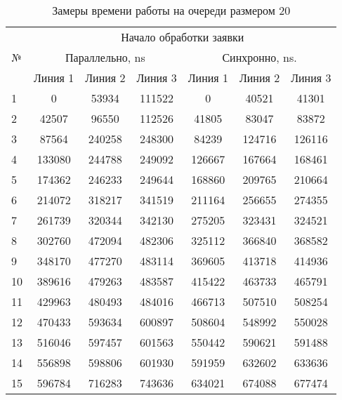 \begin{table}[h!]
    \begin{center}
    \caption{Замеры времени работы на очереди размером 20}
    \begin{tabular}{||l|c|c|c|c|c|c||}
        \hline
        \multirow{3}{*}{№} & \multicolumn{6}{c||}{Начало обработки заявки} \\ \cline{2-7} 
        & \multicolumn{3}{c|}{Параллельно, ns} & \multicolumn{3}{c||}{Синхронно, ns.} \\ \cline{2-7} 
        & Линия 1 & Линия 2 & Линия 3 & Линия 1 & Линия 2 & Линия 3 \\ \hline
        1   & 0          & 53934      & 111522     & 0          & 40521      & 41301      \\
        2   & 42507      & 96550      & 112526     & 41805      & 83047      & 83872      \\
        3   & 87564      & 240258     & 248300     & 84239      & 124716     & 126116     \\
        4   & 133080     & 244788     & 249092     & 126667     & 167664     & 168461     \\
        5   & 174362     & 246233     & 249644     & 168860     & 209765     & 210664     \\
        6   & 214072     & 318217     & 341519     & 211164     & 256655     & 274355     \\
        7   & 261739     & 320344     & 342130     & 275205     & 323431     & 324521     \\
        8   & 302760     & 472094     & 482306     & 325112     & 366840     & 368582     \\
        9   & 348170     & 477270     & 483114     & 369605     & 413718     & 414936     \\
        10  & 389616     & 479263     & 483587     & 415422     & 463733     & 465791     \\
        11  & 429963     & 480493     & 484016     & 466713     & 507510     & 508254     \\
        12  & 470433     & 593634     & 600897     & 508604     & 548992     & 550028     \\
        13  & 516046     & 597457     & 601563     & 550442     & 590621     & 591488     \\
        14  & 556898     & 598806     & 601930     & 591959     & 632602     & 633636     \\
        15  & 596784     & 716283     & 743636     & 634021     & 674088     & 677474     \\

\end{tabular}
\end{center}
\end{table}
